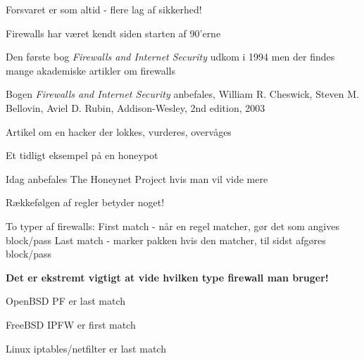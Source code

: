 \centerline{\hlkbig Forsvaret er som altid - flere lag af sikkerhed! }





\begin{list1}
\item Firewalls har været kendt siden starten af 90'erne
\item Den første bog \emph{Firewalls and Internet Security} udkom i
  1994 men der findes mange akademiske artikler om firewalls 
\item Bogen \emph{Firewalls and Internet Security} anbefales,  
William R. Cheswick, Steven M. Bellovin, Aviel D. Rubin,
Addison-Wesley, 2nd edition, 2003  
\end{list1}



\begin{list1}
\item Artikel om en hacker der lokkes, vurderes, overvåges
\item Et tidligt eksempel på en honeypot
\item Idag anbefales The Honeynet Project hvis man vil vide mere
\\
\end{list1}











\begin{list1}
\item Rækkefølgen af regler betyder noget!
\begin{list2}
\item To typer af firewalls:
 First match - når en regel matcher, gør det som angives block/pass
 Last match  - marker pakken hvis den matcher, til sidst afgøres block/pass
\end{list2}
\item {\bf Det er ekstremt vigtigt at vide hvilken type firewall
    man bruger!} 
\item OpenBSD PF er last match
\item FreeBSD IPFW er first match  
\item Linux iptables/netfilter er last match
\end{list1}

